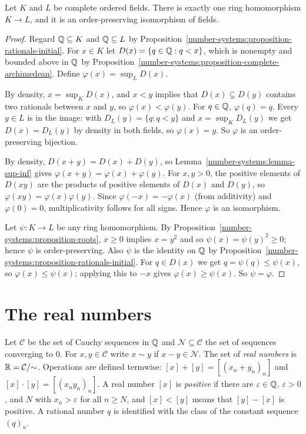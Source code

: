 \begin{theorem}\label{number-systems:theorem-uniqueness-reals}
Let $K$ and $L$ be complete ordered fields. There is exactly one ring
homomorphism $K \to L$, and it is an order-preserving isomorphism of fields.
\end{theorem}

\begin{proof}
Regard $\mathbb{Q} \subseteq K$ and $\mathbb{Q} \subseteq L$ by
Proposition~\ref{number-systems:proposition-rationals-initial}. For $x \in K$ let
$D(x) = \{q \in \mathbb{Q} : q < x\}$, which is nonempty and bounded above in $\mathbb{Q}$ by
Proposition~\ref{number-systems:proposition-complete-archimedean}. Define
$\varphi(x) = \sup_L D(x)$.

By density, $x = \sup_K D(x)$, and $x < y$ implies that $D(x) \subsetneq D(y)$
contains two rationals between $x$ and $y$, so $\varphi(x) < \varphi(y)$. For
$q \in \mathbb{Q}$, $\varphi(q) = q$. Every $y \in L$ is in the image: with
$D_L(y) = \{q : q < y\}$ and $x = \sup_K D_L(y)$ we get $D(x) = D_L(y)$ by density
in both fields, so $\varphi(x) = y$. So $\varphi$ is an order-preserving bijection.

By density, $D(x + y) = D(x) + D(y)$, so
Lemma~\ref{number-systems:lemma-sup-inf} gives $\varphi(x + y) = \varphi(x) + \varphi(y)$.
For $x, y > 0$, the positive elements of $D(xy)$ are the products of positive
elements of $D(x)$ and $D(y)$, so $\varphi(xy) = \varphi(x)\varphi(y)$. Since
$\varphi(-x) = -\varphi(x)$ (from additivity) and $\varphi(0) = 0$, multiplicativity
follows for all signs. Hence $\varphi$ is an isomorphism.

Let $\psi \colon K \to L$ be any ring homomorphism. By
Proposition~\ref{number-systems:proposition-roots}, $x \geq 0$ implies
$x = y^2$ and so $\psi(x) = \psi(y)^2 \geq 0$; hence $\psi$ is order-preserving.
Also $\psi$ is the identity on $\mathbb{Q}$ by
Proposition~\ref{number-systems:proposition-rationals-initial}. For $q \in D(x)$ we
get $q = \psi(q) \leq \psi(x)$, so $\varphi(x) \leq \psi(x)$; applying this to $-x$
gives $\varphi(x) \geq \psi(x)$. So $\psi = \varphi$.
\end{proof}

\section{The real numbers}\label{number-systems:section-reals}

\begin{definition}\label{number-systems:definition-reals}
Let $\mathcal{C}$ be the set of Cauchy sequences in $\mathbb{Q}$ and
$\mathcal{N} \subseteq \mathcal{C}$ the set of sequences converging to $0$. For
$x, y \in \mathcal{C}$ write $x \sim y$ if $x - y \in \mathcal{N}$. The set of
\emph{real numbers} is $\mathbb{R} = \mathcal{C}/{\sim}$. Operations are defined
termwise: $[x] + [y] = [(x_n + y_n)_n]$ and $[x] \cdot [y] = [(x_n y_n)_n]$. A real
number $[x]$ is \emph{positive} if there are $\varepsilon \in \mathbb{Q}$, $\varepsilon > 0$,
and $N$ with $x_n > \varepsilon$ for all $n \geq N$, and $[x] < [y]$ means that
$[y] - [x]$ is positive. A rational number $q$ is identified with the class of
the constant sequence $(q)_n$.
\end{definition}

